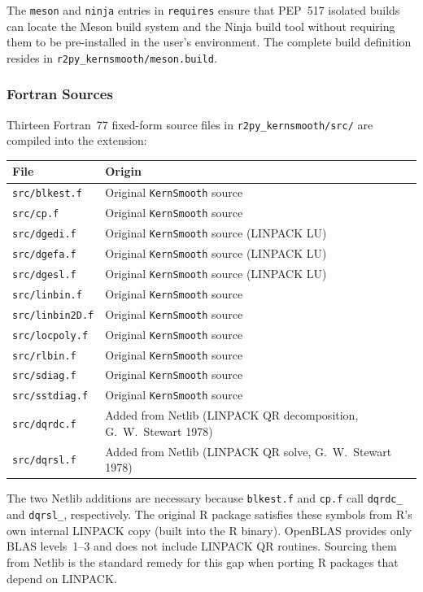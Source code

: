 \documentclass[12pt,a4paper]{article}
\begin{document}
The \texttt{meson} and \texttt{ninja} entries in \texttt{requires} ensure that PEP~517 isolated builds can locate the Meson build system and the Ninja build tool without requiring them to be pre-installed in the user's environment. The complete build definition resides in \texttt{r2py\_kernsmooth/meson.build}.

\subsubsection{Fortran Sources}

Thirteen Fortran~77 fixed-form source files in \texttt{r2py\_kernsmooth/src/} are compiled into the extension:

\begin{center}
\begin{tabular}{p{}p{}}
\toprule
File & Origin \\
\midrule
\texttt{src/blkest.f}   & Original \texttt{KernSmooth} source \\
\texttt{src/cp.f}       & Original \texttt{KernSmooth} source \\
\texttt{src/dgedi.f}    & Original \texttt{KernSmooth} source (LINPACK LU) \\
\texttt{src/dgefa.f}    & Original \texttt{KernSmooth} source (LINPACK LU) \\
\texttt{src/dgesl.f}    & Original \texttt{KernSmooth} source (LINPACK LU) \\
\texttt{src/linbin.f}   & Original \texttt{KernSmooth} source \\
\texttt{src/linbin2D.f} & Original \texttt{KernSmooth} source \\
\texttt{src/locpoly.f}  & Original \texttt{KernSmooth} source \\
\texttt{src/rlbin.f}    & Original \texttt{KernSmooth} source \\
\texttt{src/sdiag.f}    & Original \texttt{KernSmooth} source \\
\texttt{src/sstdiag.f}  & Original \texttt{KernSmooth} source \\
\texttt{src/dqrdc.f}    & Added from Netlib (LINPACK QR decomposition, G.~W.~Stewart 1978) \\
\texttt{src/dqrsl.f}    & Added from Netlib (LINPACK QR solve, G.~W.~Stewart 1978) \\
\bottomrule
\end{tabular}
\end{center}

The two Netlib additions are necessary because \texttt{blkest.f} and \texttt{cp.f} call \texttt{dqrdc\_} and \texttt{dqrsl\_}, respectively. The original R package satisfies these symbols from R's own internal LINPACK copy (built into the R binary). OpenBLAS provides only BLAS levels~1--3 and does not include LINPACK QR routines. Sourcing them from Netlib is the standard remedy for this gap when porting R packages that depend on LINPACK.
\end{document}

